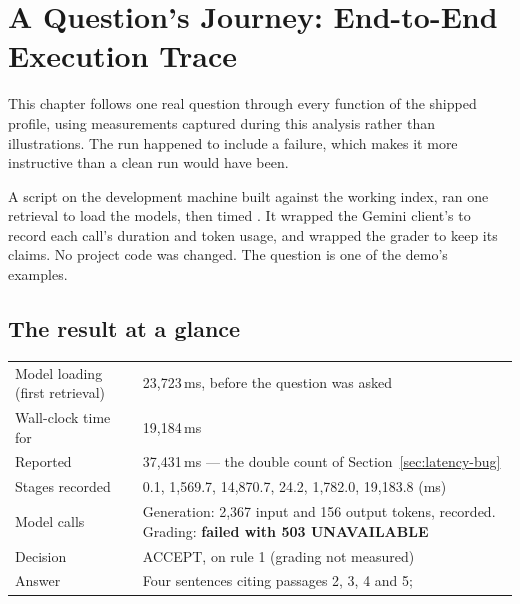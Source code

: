 \chapter{A Question's Journey: End-to-End Execution Trace}
\label{ch:trace}

This chapter follows one real question through every function of the shipped  profile, using measurements captured during this analysis rather than illustrations. The run happened to include a failure, which makes it more instructive than a clean run would have been.

\begin{measured}
A script on the development machine built  against the working index, ran one retrieval to load the models, then timed . It wrapped the Gemini client's  to record each call's duration and token usage, and wrapped the grader to keep its claims. No project code was changed. The question is one of the demo's examples.
\end{measured}

\section{The result at a glance}

\begin{center}
\begin{tabularx}{\textwidth}{@{}>{\raggedright\arraybackslash}p{5.2cm}L@{}}
\toprule
Model loading (first retrieval) & 23,723\,ms, before the question was asked\\
Wall-clock time for  & 19,184\,ms\\
Reported  & 37,431\,ms --- the double count of Section~\ref{sec:latency-bug}\\
Stages recorded &  0.1,  1,569.7,  14,870.7,  24.2,  1,782.0,  19,183.8 (ms)\\
Model calls & Generation: 2,367 input and 156 output tokens, recorded. Grading: \textbf{failed with 503 UNAVAILABLE}\\
Decision & ACCEPT, on rule 1 (grading not measured)\\
Answer & Four sentences citing passages 2, 3, 4 and 5; \\
\bottomrule
\end{tabularx}
\end{center}

